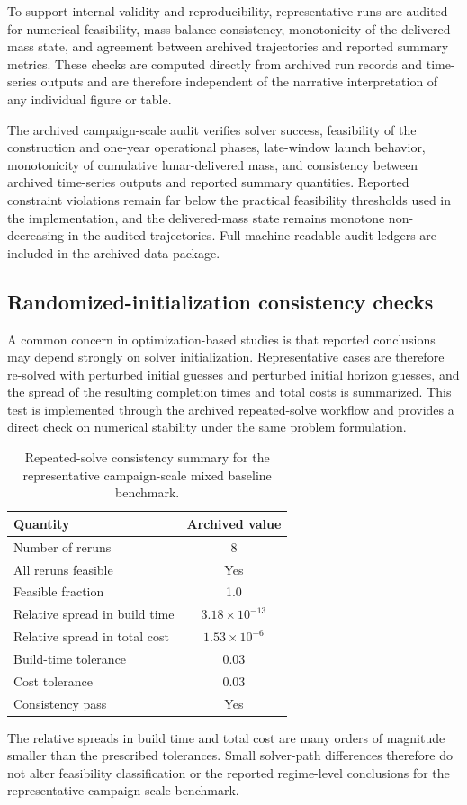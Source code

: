 \documentclass[12pt]{article}
\begin{document}
To support internal validity and reproducibility, representative runs are audited for numerical feasibility, mass-balance consistency, monotonicity of the delivered-mass state, and agreement between archived trajectories and reported summary metrics. These checks are computed directly from archived run records and time-series outputs and are therefore independent of the narrative interpretation of any individual figure or table.

The archived campaign-scale audit verifies solver success, feasibility of the construction and one-year operational phases, late-window launch behavior, monotonicity of cumulative lunar-delivered mass, and consistency between archived time-series outputs and reported summary quantities. Reported constraint violations remain far below the practical feasibility thresholds used in the implementation, and the delivered-mass state remains monotone non-decreasing in the audited trajectories. Full machine-readable audit ledgers are included in the archived data package.

\subsection{Randomized-initialization consistency checks}
\label{app:audit_findings}

A common concern in optimization-based studies is that reported conclusions may depend strongly on solver initialization. Representative cases are therefore re-solved with perturbed initial guesses and perturbed initial horizon guesses, and the spread of the resulting completion times and total costs is summarized. This test is implemented through the archived repeated-solve workflow and provides a direct check on numerical stability under the same problem formulation.

\begin{table}[htbp]
	\centering
	\caption{Repeated-solve consistency summary for the representative campaign-scale mixed baseline benchmark.}
	\label{tab:consistency_summary_app}
	\small
	\begin{tabular}{lc}
		\hline
		Quantity & Archived value \\
		\hline
		Number of reruns & 8 \\
		All reruns feasible & Yes \\
		Feasible fraction & 1.0 \\
		Relative spread in build time & \(3.18\times 10^{-13}\) \\
		Relative spread in total cost & \(1.53\times 10^{-6}\) \\
		Build-time tolerance & 0.03 \\
		Cost tolerance & 0.03 \\
		Consistency pass & Yes \\
		\hline
	\end{tabular}
\end{table}

The relative spreads in build time and total cost are many orders of magnitude smaller than the prescribed tolerances. Small solver-path differences therefore do not alter feasibility classification or the reported regime-level conclusions for the representative campaign-scale benchmark.
\end{document}
